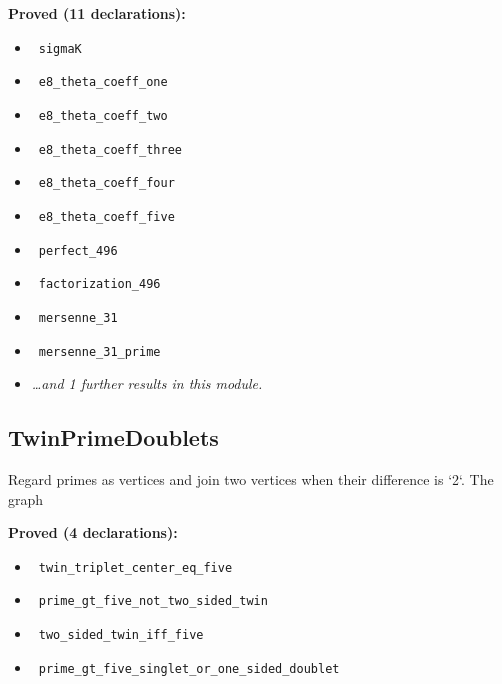\documentclass{report}
\theoremstyle{definition}
\begin{document}
\begin{itemize}
\begin{itemize}
\noindent\textbf{Proved (11 declarations):}
\begin{itemize}
  \item {}\leanok\ \texttt{sigmaK}
  \item {}\leanok\ \texttt{e8\_theta\_coeff\_one}
  \item {}\leanok\ \texttt{e8\_theta\_coeff\_two}
  \item {}\leanok\ \texttt{e8\_theta\_coeff\_three}
  \item {}\leanok\ \texttt{e8\_theta\_coeff\_four}
  \item {}\leanok\ \texttt{e8\_theta\_coeff\_five}
  \item {}\leanok\ \texttt{perfect\_496}
  \item {}\leanok\ \texttt{factorization\_496}
  \item {}\leanok\ \texttt{mersenne\_31}
  \item {}\leanok\ \texttt{mersenne\_31\_prime}
  \item \emph{\ldots and 1 further results in this module.}
\end{itemize}

\subsection{TwinPrimeDoublets}
Regard primes as vertices and join two vertices when their difference is `2`.  The graph

\noindent\textbf{Proved (4 declarations):}
\begin{itemize}
  \item {}\leanok\ \texttt{twin\_triplet\_center\_eq\_five}
  \item {}\leanok\ \texttt{prime\_gt\_five\_not\_two\_sided\_twin}
  \item {}\leanok\ \texttt{two\_sided\_twin\_iff\_five}
  \item {}\leanok\ \texttt{prime\_gt\_five\_singlet\_or\_one\_sided\_doublet}
\end{itemize}


\end{itemize}
\end{itemize}
\end{document}
